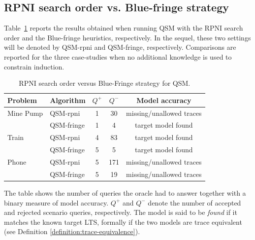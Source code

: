 
\subsection{RPNI search order vs. Blue-fringe strategy\label{subsection:evaluation-bluefringe-on-casestudies}}

Table~\ref{RPNI:Blue-fringe} reports the results obtained when running QSM with the RPNI search order and the Blue-fringe heuristics, respectively. In the sequel, these two settings will be denoted by QSM-rpni and QSM-fringe, respectively. Comparisons are reported for the three case-studies when no additional knowledge is used to constrain induction. 

\begin{table}[H]
\centering
\begin{tabular}{|l||l||c|c|c|}\hline
Problem   & Algorithm   &$Q^+$&$Q^-$& Model accuracy\\\hline\hline
Mine Pump & QSM-rpni    & 1   & 30  & missing/unallowed traces\\\cline{2-5}
          & QSM-fringe  & 1   & 4   & target model found\\\hline
Train     & QSM-rpni    & 4   & 83  & target model found\\\cline{2-5}
          & QSM-fringe  & 5   & 5   & target model found\\\hline
Phone     & QSM-rpni    & 5   & 171 & missing/unallowed traces\\\cline{2-5}
          & QSM-fringe  & 5   & 19  & missing/unallowed traces\\\hline
\end{tabular}
\caption{RPNI search order versus Blue-Fringe strategy for QSM.\label{RPNI:Blue-fringe}}
\end{table}

The table shows the number of queries the oracle had to answer together with a binary measure of model accuracy. $Q^+$ and $Q^-$ denote the number of accepted and rejected scenario queries, respectively. The model is said to be \emph{found} if it matches the known target LTS, formally if the two models are trace equivalent (see Definition \ref{definition:trace-equivalence}). 

